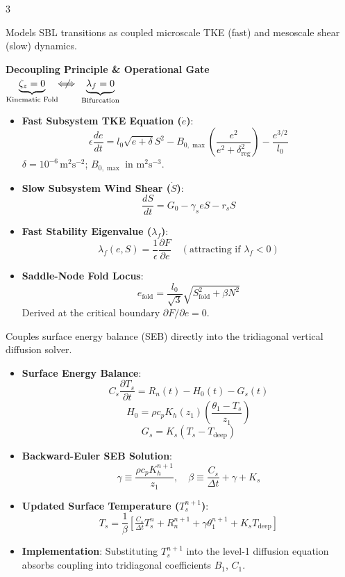 \documentclass[9pt,landscape,letterpaper]{article}
\begin{document}
\begin{multicols}{3}
\columnbreak

\begin{tcolorbox}[cheatsheetbox, title=2. 2D Fast-Slow System \& Gate]
Models SBL transitions as coupled microscale TKE (fast) and mesoscale shear (slow) dynamics.
\begin{center}
\textbf{Decoupling Principle \& Operational Gate}\\[2pt]
$\underbrace{\zeta_z = 0}_{\text{Kinematic Fold}} \ \not\!\!\!\!\Longleftrightarrow \ \underbrace{\lambda_f = 0}_{\text{Bifurcation}}$\\[4pt]
\end{center}
\begin{itemize}
    \item \textbf{Fast Subsystem TKE Equation ($\dot{e}$)}:
    $$\epsilon \frac{de}{dt} = l_0 \sqrt{e + \delta} S^2 - B_{0,\max}\left(\frac{e^2}{e^2 + \delta_{\text{reg}}^2}\right) - \frac{e^{3/2}}{l_0}$$
    $\delta = 10^{-6}\,\text{m}^2\text{s}^{-2}$; $B_{0,\max}$ in $\text{m}^2\text{s}^{-3}$.
    \item \textbf{Slow Subsystem Wind Shear ($\dot{S}$)}:
    $$\frac{dS}{dt} = G_0 - \gamma_s e S - r_s S$$
    \item \textbf{Fast Stability Eigenvalue ($\lambda_f$)}:
    $$\lambda_f(e, S) = \frac{1}{\epsilon} \frac{\partial F}{\partial e} \quad (\text{attracting if } \lambda_f < 0)$$
    \item \textbf{Saddle-Node Fold Locus}:
    $$e_{\text{fold}} = \frac{l_0}{\sqrt{3}}\sqrt{S_{\text{fold}}^2 + \beta N^2}$$
    Derived at the critical boundary $\partial F / \partial e = 0$.
\end{itemize}
\end{tcolorbox}

\columnbreak

\begin{tcolorbox}[cheatsheetbox, title=3. SCM Implicit Coupling \& SEB]
Couples surface energy balance (SEB) directly into the tridiagonal vertical diffusion solver.
\begin{itemize}
    \item \textbf{Surface Energy Balance}:
    $$C_s \frac{\partial T_s}{\partial t} = R_n(t) - H_0(t) - G_s(t)$$
    $$H_0 = \rho c_p K_h(z_1) \left(\frac{\theta_1 - T_s}{z_1}\right)$$
    $$G_s = K_s (T_s - T_{\text{deep}})$$
    \item \textbf{Backward-Euler SEB Solution}:
    $$\gamma \equiv \frac{\rho c_p K_h^{n+1}}{z_1}, \quad \beta \equiv \frac{C_s}{\Delta t} + \gamma + K_s$$
    \item \textbf{Updated Surface Temperature ($T_s^{n+1}$)}:
    $$T_s = \frac{1}{\beta} \left[ \tfrac{C_s}{\Delta t} T_s^n + R_n^{n+1} + \gamma \theta_1^{n+1} + K_s T_{\text{deep}} \right]$$
    \item \textbf{Implementation}: Substituting $T_s^{n+1}$ into the level-1 diffusion equation absorbs coupling into tridiagonal coefficients $B_1$, $C_1$.
\end{itemize}
\end{tcolorbox}

\end{multicols}
\end{document}
